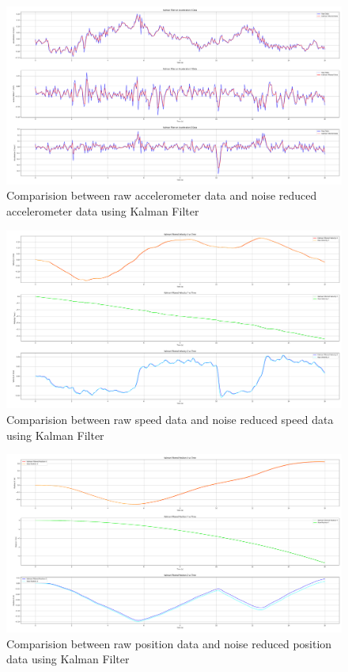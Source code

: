 \documentclass{article}
\begin{document}
\FloatBarrier
\begin{figure}[h]
    \centering
    \includegraphics[width=\textwidth]{2_1_8_1.png}
    \caption{Comparision between raw accelerometer data and noise reduced accelerometer data using Kalman Filter}
    \label{fig:accel_kalman}
\end{figure}
\FloatBarrier
\begin{figure}[h]
    \centering
    \includegraphics[width=\textwidth]{2_1_8_2.png}
    \caption{Comparision between raw speed data and noise reduced speed data using Kalman Filter}
    \label{fig:speed_kalman}
\end{figure}
\FloatBarrier
\begin{figure}[h]
    \centering
    \includegraphics[width=\textwidth]{2_1_8_3.png}
    \caption{Comparision between raw position data and noise reduced position data using Kalman Filter}
    \label{fig:position_kalman}
\end{figure}
\end{document}
